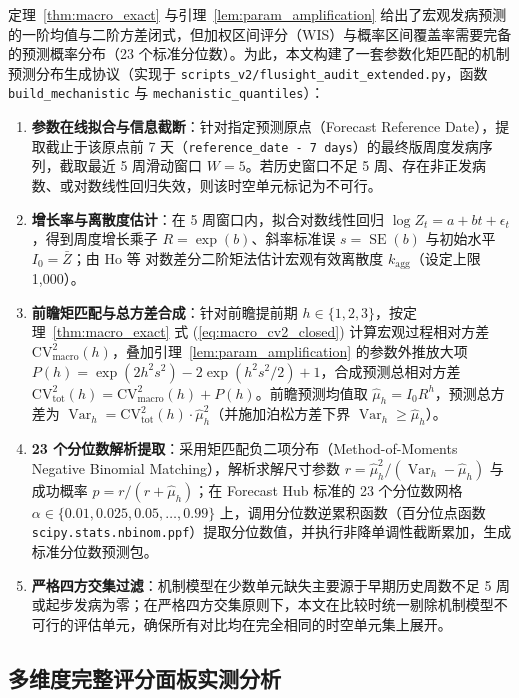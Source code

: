 \documentclass[10pt,a4paper]{article}
\theoremstyle{plain}
\theoremstyle{definition}
\begin{document}
定理~\ref{thm:macro_exact} 与引理~\ref{lem:param_amplification} 给出了宏观发病预测的一阶均值与二阶方差闭式，但加权区间评分（WIS）与概率区间覆盖率需要完备的预测概率分布（23 个标准分位数）。为此，本文构建了一套参数化矩匹配的机制预测分布生成协议（实现于 \texttt{scripts\_v2/flusight\_audit\_extended.py}，函数 \texttt{build\_mechanistic} 与 \texttt{mechanistic\_quantiles}）：
\begin{enumerate}
\item \textbf{参数在线拟合与信息截断}：针对指定预测原点（Forecast Reference Date），提取截止于该原点前 7 天（\texttt{reference\_date - 7 days}）的最终版周度发病序列，截取最近 5 周滑动窗口 $W=5$。若历史窗口不足 5 周、存在非正发病数、或对数线性回归失效，则该时空单元标记为不可行。
\item \textbf{增长率与离散度估计}：在 5 周窗口内，拟合对数线性回归 $\log Z_t = a + bt + \epsilon_t$，得到周度增长乘子 $R = \exp(b)$、斜率标准误 $s = \operatorname{SE}(b)$ 与初始水平 $I_0 = \bar{Z}$；由 Ho 等\citep{ho2023simultaneous} 对数差分二阶矩法估计宏观有效离散度 $k_{\text{agg}}$（设定上限 1,000）。
\item \textbf{前瞻矩匹配与总方差合成}：针对前瞻提前期 $h \in \{1, 2, 3\}$，按定理~\ref{thm:macro_exact} 式 (\ref{eq:macro_cv2_closed}) 计算宏观过程相对方差 $\text{CV}^2_{\text{macro}}(h)$，叠加引理~\ref{lem:param_amplification} 的参数外推放大项 $P(h) = \exp(2h^2s^2) - 2\exp(h^2s^2/2) + 1$，合成预测总相对方差 $\text{CV}^2_{\text{tot}}(h) = \text{CV}^2_{\text{macro}}(h) + P(h)$。前瞻预测均值取 $\hat{\mu}_h = I_0 R^h$，预测总方差为 $\operatorname{Var}_h = \text{CV}^2_{\text{tot}}(h) \cdot \hat{\mu}_h^2$（并施加泊松方差下界 $\operatorname{Var}_h \ge \hat{\mu}_h$）。
\item \textbf{23 个分位数解析提取}：采用矩匹配负二项分布（Method-of-Moments Negative Binomial Matching），解析求解尺寸参数 $r = \hat{\mu}_h^2 / (\operatorname{Var}_h - \hat{\mu}_h)$ 与成功概率 $p = r / (r + \hat{\mu}_h)$；在 Forecast Hub 标准的 23 个分位数网格 $\alpha \in \{0.01, 0.025, 0.05, \dots, 0.99\}$ 上，调用分位数逆累积函数（百分位点函数 \texttt{scipy.stats.nbinom.ppf}）提取分位数值，并执行非降单调性截断累加，生成标准分位数预测包。
\item \textbf{严格四方交集过滤}：机制模型在少数单元缺失主要源于早期历史周数不足 5 周或起步发病为零；在严格四方交集原则下，本文在比较时统一剔除机制模型不可行的评估单元，确保所有对比均在完全相同的时空单元集上展开。
\end{enumerate}

\subsection{多维度完整评分面板实测分析}\label{sec:flusight_scores}
\end{document}
